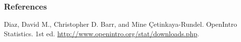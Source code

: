\documentclass{beamer}\usepackage{graphicx, color}
\begin{document}




\begin{frame}[allowframebreaks]
  \frametitle{References}
  Diaz, David M., Christopher D. Barr, and Mine \c{C}etinkaya-Rundel. OpenIntro Statistics. 1st ed. \url{http://www.openintro.org/stat/downloads.php}. \\[0.25cm] 
\end{frame}
\end{document}
